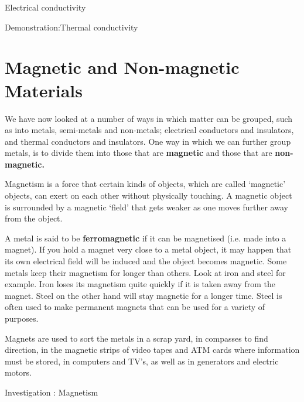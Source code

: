 \begin{iexperiment}{Electrical conductivity}
\begin{gexperiment}{Demonstration:Thermal conductivity}
            \section{Magnetic and Non-magnetic Materials}
            \nopagebreak
      \label{m38706*id67151}We have now looked at a number of ways in which matter can be grouped, such as into metals, semi-metals and non-metals; electrical conductors and insulators, and thermal conductors and insulators. One way in which we can further group metals, is to divide them into those that are \textbf{magnetic} and those that are \textbf{non-magnetic.}\par 
\par
\Definition{   \label{id2410309} { Magnetism }} { \label{m38706*meaningfhsst!!!underscore!!!id570}
      \label{m38706*id67174}Magnetism is a force that certain kinds of objects, which are called `magnetic' objects, can exert on each other without physically touching. A magnetic object is surrounded by a magnetic `field' that gets weaker as one moves further away from the object. \par 
       } 
      \label{m38706*id67186}A metal is said to be \textbf{ferromagnetic} if it can be magnetised (i.e. made into a magnet). If you hold a magnet very close to a metal object, it may happen that its own electrical field will be induced and the object becomes magnetic. Some metals keep their magnetism for longer than others. Look at iron and steel for example. Iron loses its magnetism quite quickly if it is taken away from the magnet. Steel on the other hand will stay magnetic for a longer time. Steel is often used to make permanent magnets that can be used for a variety of purposes.\par 
      \label{m38706*id67200}Magnets are used to sort the metals in a scrap yard, in compasses to find direction, in the magnetic strips of video tapes and ATM cards where information must be stored, in computers and TV's, as well as in generators and electric motors.\par 
\label{m38706*secfhsst!!!underscore!!!id575}
            \begin{gexperiment}{Investigation : Magnetism}{
}
\end{gexperiment}
\end{gexperiment}
\end{iexperiment}
